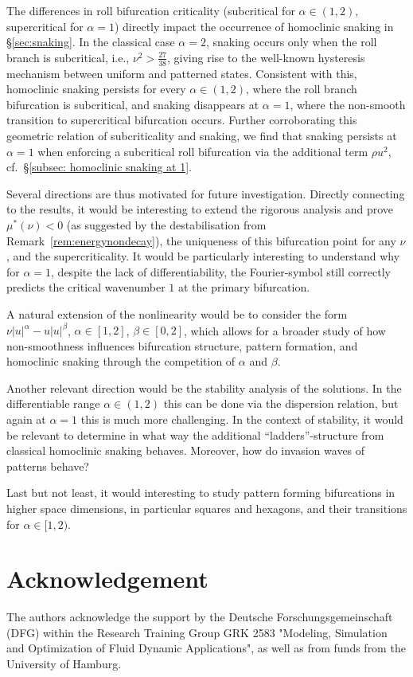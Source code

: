 \documentclass{article}
\numberwithin{equation}{section}
\begin{document}
	The differences in roll bifurcation criticality (subcritical for $\alpha\in(1,2)$, supercritical for $\alpha=1$) directly impact the occurrence of homoclinic snaking in \S\ref{sec:snaking}. In the classical case $\alpha=2$, snaking occurs only when the roll branch is subcritical, i.e., $\nu^2>\frac{27}{38}$, giving rise to the well-known hysteresis mechanism between uniform and patterned states. Consistent with this, homoclinic snaking persists for every $\alpha \in (1,2)$, where the roll branch bifurcation is subcritical, and snaking disappears at $\alpha=1$, where the non-smooth transition to supercritical bifurcation occurs. Further corroborating this geometric relation of subcriticality and snaking, we find that snaking persists at $\alpha=1$ when enforcing a subcritical roll bifurcation via the additional term $\rho u^2$, cf.\ \S\ref{subsec: homoclinic snaking at 1}. 
	


\medskip	
	Several directions are thus motivated for future investigation. 
	Directly connecting to the results, it would be interesting to extend the rigorous analysis and prove $\mu^*(\nu)<0$ (as suggested by the destabilisation from Remark~\ref{rem:energynondecay}),  
	the uniqueness of this bifurcation point for any $\nu$, and the supercriticality. 
	 It would be particularly interesting to understand why for $\alpha=1$, despite the lack of differentiability, the Fourier-symbol still correctly predicts the critical wavenumber $1$ at the primary bifurcation. 
		
	A natural extension of the nonlinearity would be to consider the form 	$\nu |u|^\alpha - u|u|^\beta$, $\alpha \in [1,2]$, $\beta \in [0,2]$, which allows for a broader study of how non-smoothness influences bifurcation structure, pattern formation, and homoclinic snaking through the competition of $\alpha$ and $\beta$. 
	
	Another relevant direction would be the stability analysis of the solutions. In the differentiable range $\alpha\in(1,2)$ this can be done via the dispersion relation, but again at $\alpha=1$ this is much more challenging. In the context of stability, it would be relevant to determine in what way the additional ``ladders''-structure from classical homoclinic snaking behaves. Moreover, how do invasion waves of patterns behave? 
	
	
	Last but not least, it would interesting to study pattern forming bifurcations in higher space dimensions, in particular squares and hexagons, and their transitions for $\alpha\in[1,2)$. 
		

\section*{Acknowledgement} The authors acknowledge the support by the Deutsche Forschungsgemeinschaft (DFG) within the Research Training Group GRK 2583 "Modeling, Simulation and Optimization of Fluid Dynamic Applications", as well as from funds from the University of Hamburg.




\end{document}
